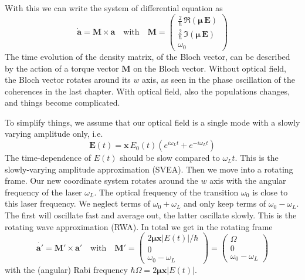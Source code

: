 With this we can write the system of differential equation as 
\[
 \dot{\boldsymbol{a}} = \boldsymbol{M}   \times \boldsymbol{a} 
 \quad \text{with} \quad 
 \boldsymbol{M}  = 
 \begin{pmatrix}
 \frac{2}{\hbar} \, \Re ( \boldsymbol{\mu} \, \boldsymbol{E} ) \\
  \frac{2}{\hbar} \, \Im ( \boldsymbol{\mu} \, \boldsymbol{E} ) \\
  \omega_0
 \end{pmatrix}
\]
The time evolution of the density matrix, of the Bloch vector, can be described by the action of a torque vector $\boldsymbol{M}$ on the Bloch vector. Without optical field, the Bloch vector rotates around its $w$ axis, as seen in the phase oscillation of the coherences in the last chapter. With optical field, also the populations changes, and things become complicated.

To simplify things, we assume that our optical field is a single mode with a slowly varying amplitude only, i.e.
\[
 \boldsymbol{E}(t) = \boldsymbol{x} \, E_0(t) \left( e^{i \omega_L t} + e^{-i \omega_L t} \right)
\]
The time-dependence of $E(t)$ should be slow compared to $\omega_L t$. This is the slowly-varying amplitude approximation (SVEA). Then we move into a rotating frame. Our new coordinate system rotates around the $w$ axis with the angular frequency of the laser $\omega_L$. The optical frequency of the transition $\omega_0$ is close to this laser frequency. We neglect terms of $\omega_0 + \omega_L$ and only keep terms of  $\omega_0 - \omega_L$. The first will oscillate fast and average out, the latter oscillate slowly. This is the rotating wave approximation (RWA). In total we get in the rotating frame 
\[
 \dot{\boldsymbol{a}'} = \boldsymbol{M}'   \times \boldsymbol{a}' 
 \quad \text{with} \quad 
 \boldsymbol{M}'  = 
 \begin{pmatrix}
2 \boldsymbol{\mu}  \boldsymbol{x}   |E(t)| / \hbar \\
0 \\
\omega_0 - \omega_L
 \end{pmatrix} = 
  \begin{pmatrix}
\Omega \\
0 \\
\omega_0 - \omega_L
 \end{pmatrix}
\]
with the (angular) Rabi frequency $\hbar \Omega = 2 \boldsymbol{\mu}  \boldsymbol{x}   |E(t)| $.






